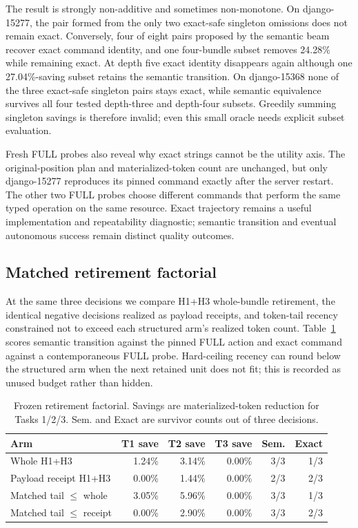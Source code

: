 \documentclass[11pt]{article}
\begin{document}
The result is strongly non-additive and sometimes non-monotone.  On
django-15277, the pair formed from the only two exact-safe singleton omissions
does not remain exact.  Conversely, four of eight pairs proposed by the
semantic beam recover exact command identity, and one four-bundle subset
removes 24.28\% while remaining exact.  At depth five exact identity disappears
again although one 27.04\%-saving subset retains the semantic transition.
On django-15368 none of the three exact-safe singleton pairs stays exact, while
semantic equivalence survives all four tested depth-three and depth-four
subsets.  Greedily summing singleton savings is therefore invalid; even this
small oracle needs explicit subset evaluation.

Fresh FULL probes also reveal why exact strings cannot be the utility axis.
The original-position plan and materialized-token count are unchanged, but
only django-15277 reproduces its pinned command exactly after the server
restart.  The other two FULL probes choose different commands that perform the
same typed operation on the same resource.  Exact trajectory remains a useful
implementation and repeatability diagnostic; semantic transition and eventual
autonomous success remain distinct quality outcomes.

\subsection{Matched retirement factorial}

At the same three decisions we compare H1+H3 whole-bundle retirement, the
identical negative decisions realized as payload receipts, and token-tail
recency constrained not to exceed each structured arm's realized token count.
Table~\ref{tab:retirement-factorial-three} scores semantic transition against
the pinned FULL action and exact command against a contemporaneous FULL probe.
Hard-ceiling recency can round below the structured arm when the next retained
unit does not fit; this is recorded as unused budget rather than hidden.

\begin{table}[H]
\centering
\scriptsize
\caption{Frozen retirement factorial. Savings are materialized-token reduction
for Tasks 1/2/3. Sem. and Exact are survivor counts out of three decisions.}
\label{tab:retirement-factorial-three}
\begin{tabular}{lrrrrr}
\toprule
Arm & T1 save & T2 save & T3 save & Sem. & Exact \\
\midrule
Whole H1+H3 & 1.24\% & 3.14\% & 0.00\% & 3/3 & 1/3 \\
Payload receipt H1+H3 & 0.00\% & 1.44\% & 0.00\% & 2/3 & 2/3 \\
Matched tail $\leq$ whole & 3.05\% & 5.96\% & 0.00\% & 3/3 & 1/3 \\
Matched tail $\leq$ receipt & 0.00\% & 2.90\% & 0.00\% & 3/3 & 2/3 \\
\bottomrule
\end{tabular}
\end{table}
\end{document}
